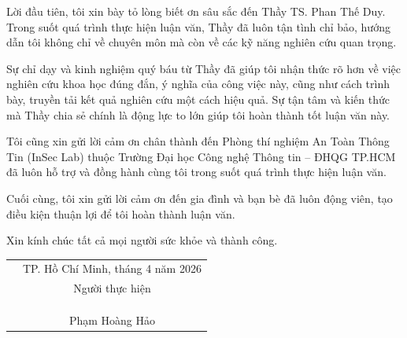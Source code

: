 \begin{acknowledgements}

Lời đầu tiên, tôi xin bày tỏ lòng biết ơn sâu sắc đến Thầy TS. Phan Thế Duy. Trong suốt quá trình thực hiện luận văn, Thầy đã luôn tận tình chỉ bảo, hướng dẫn tôi không chỉ về chuyên môn mà còn về các kỹ năng nghiên cứu quan trọng.

Sự chỉ dạy và kinh nghiệm quý báu từ Thầy đã giúp tôi nhận thức rõ hơn về việc nghiên cứu khoa học đúng đắn, ý nghĩa của công việc này, cũng như cách trình bày, truyền tải kết quả nghiên cứu một cách hiệu quả. Sự tận tâm và kiến thức mà Thầy chia sẻ chính là động lực to lớn giúp tôi hoàn thành tốt luận văn này.

Tôi cũng xin gửi lời cảm ơn chân thành đến Phòng thí nghiệm An Toàn Thông Tin (InSec Lab) thuộc Trường Đại học Công nghệ Thông tin -- ĐHQG TP.HCM đã luôn hỗ trợ và đồng hành cùng tôi trong suốt quá trình thực hiện luận văn.

Cuối cùng, tôi xin gửi lời cảm ơn đến gia đình và bạn bè đã luôn động viên, tạo điều kiện thuận lợi để tôi hoàn thành luận văn.

Xin kính chúc tất cả mọi người sức khỏe và thành công.

\vspace{1cm}
\begin{tabular*}{\textwidth}{@{\extracolsep{\fill}}cc}
& TP. Hồ Chí Minh, tháng 4 năm 2026 \\
& Người thực hiện \\
& \\
& \\
& \\
& Phạm Hoàng Hảo \\
\end{tabular*}

\end{acknowledgements}
